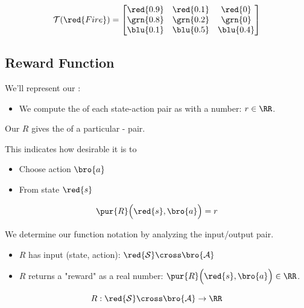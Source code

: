         \begin{equation}
            \mathcal{T}(\red{Fire}) = 
                \begin{bmatrix}
                \red{0.9} & \red{0.1} & \red{0} \\
                \grn{0.8} & \grn{0.2} & \grn{0} \\
                \blu{0.1} & \blu{0.5} & \blu{0.4}
            \end{bmatrix}
        \end{equation}

    \pagebreak

    \subsection{Reward Function}

        We'll represent our :

        \begin{itemize}
            \item We compute the  of each state-action pair as with a number: $r \in \RR$.\\
        \end{itemize}

        \begin{definition}
            Our  $R$ gives the  of a particular - pair.

            This indicates how desirable it is to 

            \begin{itemize}
                \item Choose action $\bro{a}$
                \item From state $\red{s}$
            \end{itemize}

            \begin{equation*}
                \pur{R} \Big( \red{s},\bro{a} \Big)  = r
            \end{equation*}

            \subsecdiv

            We determine our function notation by analyzing the input/output pair.

            \begin{itemize}
                \item $R$ has input (state, action): $\red{\mathcal{S}} \cross \bro{\mathcal{A}}$
                \item $R$ returns a "reward" as a real number: $\pur{R} \Big( \red{s},\bro{a} \Big) \in \RR$.
            \end{itemize}

            \begin{equation*}
                R: \red{\mathcal{S}} \cross \bro{\mathcal{A}} \to \RR
            \end{equation*}
        \end{definition}

